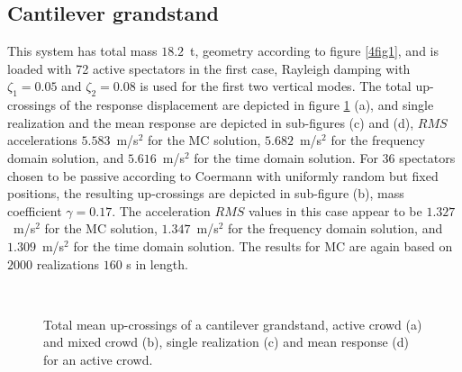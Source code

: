 \documentclass[preprint,12pt,authoryear]{elsarticle}
\begin{document}
\subsection{Cantilever grandstand}
\label{cantilever}
This system has total mass $18.2$~t, geometry according to figure \ref{4fig1}, and is loaded with 72 active spectators in the first case, Rayleigh damping with $\zeta_1=0.05$ and $\zeta_2=0.08$ is used for the first two vertical modes. The total up-crossings of the response displacement are depicted in figure \ref{4fig5} (a), and single realization and the mean response are depicted in sub-figures (c) and (d), $RMS$ accelerations $5.583$~m/s$^2$ for the MC solution, $5.682$~m/s$^2$ for the frequency domain solution, and $5.616$~m/s$^2$ for the time domain solution. For 36 spectators chosen to be passive according to Coermann with uniformly random but fixed positions, the resulting up-crossings are depicted in sub-figure (b), mass coefficient $\gamma=0.17$. The acceleration $RMS$ values in this case appear to be $1.327$~m/s$^2$ for the MC solution, $1.347$~m/s$^2$ for the frequency domain solution, and $1.309$~m/s$^2$ for the time domain solution. The results for MC are again based on $2000$ realizations $160$ s in length.
\begin{figure}
	\centering
{}
\\
	\caption{Total mean up-crossings of a cantilever grandstand, active crowd (a) and mixed crowd (b), single realization (c) and mean response (d) for an active crowd.}
	\label{4fig5}
\end{figure}
\end{document}
